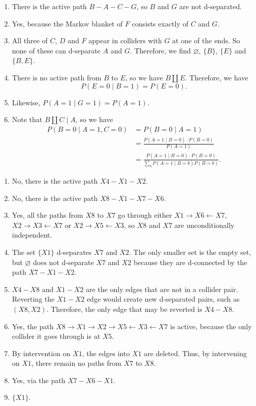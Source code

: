 \documentclass{article}
\newcommand{\cprob}[2]{\prob{#1\mathbin|#2}}
\newcommand{\prob}[1]{P(#1)}
\newcommand{\indep}[2]{#1\mathbin{\amalg}#2}
\newcommand{\cindep}[3]{\indep{#1}{#2}\mid #3}
\begin{document}
\begin{ex}
\begin{enumerate}
\item There is the active path $B-A-C-G$, so $B$ and $G$ are not d-separated.
\item Yes, because the Markov blanket of $F$ consists exactly of $C$ and $G$.
\item All three of $C$, $D$ and $F$ appear in colliders with $G$ at one of the
ends. So none of these can d-separate $A$ and $G$. Therefore, we find
$\varnothing$, $\{B\}$, $\{E\}$ and $\{B,E\}$. 
\item There is no active path from $B$ to $E$, so we have $\indep{B}{E}$.
Therefore, we have
\begin{equation*}
\cprob{E=0}{B=1}=\prob{E=0}.
\end{equation*}
\item Likewise, $\cprob{A=1}{G=1}=\prob{A=1}$. 
\item Note that $\cindep{B}{C}{A}$, so we have
\begin{align*}
\cprob{B=0}{A=1,C=0}
  & =
\cprob{B=0}{A=1}
  \\
  & =
\frac{\cprob{A=1}{B=0}\cdot\prob{B=0}}{\prob{A=1}}
  \\
  & =
\frac{\cprob{A=1}{B=0}\cdot\prob{B=0}}{\sum_b\cprob{A=1}{B=b}\prob{B=b}}.
\end{align*}
\end{enumerate}
\end{ex}

\begin{ex}
\begin{enumerate}
\item No, there is the active path $X4-X1-X2$.
\item No, there is the active path $X8-X1-X7-X6$.
\item Yes, all the paths from $X8$ to $X7$ go through either 
$X1\rightarrow X6\leftarrow X7$, $X2\rightarrow X3\leftarrow X7$ or
$X2\rightarrow X5\leftarrow X3$, so $X8$ and $X7$ are unconditionally 
independent.
\item The set $\{X1\}$ d-separates $X7$ and $X2$. The only smaller set is
the empty set, but $\varnothing$ does not d-separate $X7$ and $X2$ because
they are d-connected by the path $X7-X1-X2$.
\item $X4-X8$ and $X1-X2$ are the only edges that are not in a collider pair.
Reverting the $X1-X2$ edge would create new d-separated pairs, such as 
$(X8,X2)$. Therefore, the only edge that may be reverted is $X4-X8$.
\item Yes, the path $X8 \rightarrow X1 \rightarrow X2 \rightarrow X5
\leftarrow X3 \leftarrow X7$ is active, because the only collider it goes through
is at $X5$.
\item By intervention on $X1$, the edges into $X1$ are deleted. Thus, by intervening
on $X1$, there remain no paths from $X7$ to $X8$.
\item Yes, via the path $X7-X6-X1$.
\item $\{X1\}$. 
\end{enumerate}
\end{ex}
\end{document}
